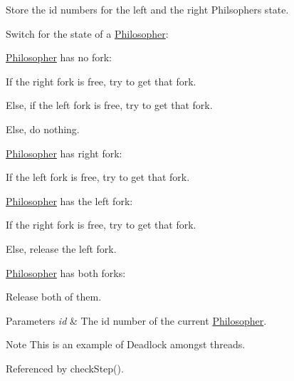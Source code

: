 \begin{DoxyItemize}
\item Store the id numbers for the left and the right Philsopher\textquotesingle{}s state.
\item Switch for the state of a \hyperlink{class_philosopher}{Philosopher}\+:
\begin{DoxyItemize}
\item \hyperlink{class_philosopher}{Philosopher} has no fork\+:
\begin{DoxyItemize}
\item If the right fork is free, try to get that fork.
\item Else, if the left fork is free, try to get that fork.
\item Else, do nothing.
\end{DoxyItemize}
\item \hyperlink{class_philosopher}{Philosopher} has right fork\+:
\begin{DoxyItemize}
\item If the left fork is free, try to get that fork.
\end{DoxyItemize}
\item \hyperlink{class_philosopher}{Philosopher} has the left fork\+:
\begin{DoxyItemize}
\item If the right fork is free, try to get that fork.
\item Else, release the left fork.
\end{DoxyItemize}
\item \hyperlink{class_philosopher}{Philosopher} has both forks\+:
\begin{DoxyItemize}
\item Release both of them.
\end{DoxyItemize}
\end{DoxyItemize}
\end{DoxyItemize}
\begin{DoxyParams}{Parameters}
{\em id} & The id number of the current \hyperlink{class_philosopher}{Philosopher}. \\
\hline
\end{DoxyParams}
\begin{DoxyNote}{Note}
This is an example of Deadlock amongst threads. 
\end{DoxyNote}


Referenced by check\+Step().

\mbox{\label{class_table_a72f12ad53efb6444fb07f29ced36555e}} 
